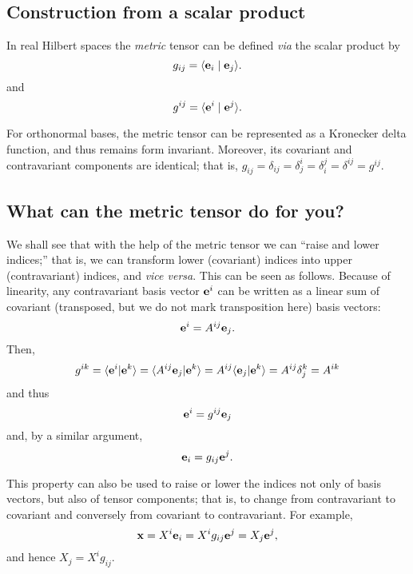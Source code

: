 \subsection{Construction from a scalar product}

In real Hilbert spaces the {\em metric} tensor can be defined {\it via}  the scalar product  by
\begin{equation}
g_{ij}= \langle {\bf e}_i \mid {\bf e}_j\rangle .
\label{2016-m-ch-tensor-gij}
\end{equation}
and
\begin{equation}
g^{ij}= \langle {\bf e}^i \mid {\bf e}^j\rangle .
\label{2016-m-ch-tensor-gij2}
\end{equation}




For orthonormal bases, the metric tensor can be
represented as a Kronecker delta function, and thus  remains form invariant.
Moreover, its covariant and contravariant components are identical; that is,
$g_{ij}=\delta_{ij}=\delta^i_j=\delta_i^j=\delta^{ij}=g^{ij}$.


\subsection{What can the metric tensor do for you?}

We shall see that with the help of the metric tensor we can ``raise and lower indices;''
that is, we can transform lower (covariant) indices into upper (contravariant) indices, and {\it vice versa}.
This can be seen as follows.
Because of linearity, any contravariant basis vector ${\bf e}^i$
can be written as a linear sum of covariant (transposed, but we do not mark transposition here) basis vectors:
\begin{equation}
{\bf e}^i=A^{ij}{\bf e}_j.
\end{equation}
Then,
\begin{equation}
g^{ik} = \langle {\bf e}^i \vert {\bf e}^k \rangle  =\langle A^{ij}{\bf e}_j\vert  {\bf e}^k  \rangle
=A^{ij}\langle {\bf e}_j \vert  {\bf e}^k\rangle =A^{ij}\delta_j^k=A^{ik}
\end{equation}
and thus
\begin{equation}
{\bf e}^i=g^{ij}{\bf e}_j
\end{equation}
and, by a similar argument,
\begin{equation}
{\bf e}_i=g_{ij}{\bf e}^j.
\end{equation}


This property can also be used to raise or lower the indices not only of basis vectors, but also of tensor components; that is,
to change from contravariant to covariant and conversely from covariant
to contravariant.
For example,
\begin{equation}
{\bf x} =
X^i {\bf e}_i = X^i g_{ij} {\bf e}^j   = X_j {\bf e}^j,
\end{equation}
and hence $X_j = X^i g_{ij}$.

